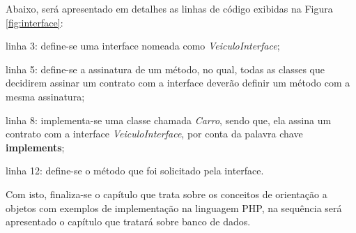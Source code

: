Abaixo, será apresentado em detalhes as linhas de código exibidas na Figura
\ref{fig:interface}:

\begin{alineas}
    \item linha 3: define-se uma interface nomeada como
    \textit{VeiculoInterface};
    \item linha 5: define-se a assinatura de um método, no qual, todas as
    classes que decidirem assinar um contrato com a interface deverão definir um
    método com a mesma assinatura;
    \item linha 8: implementa-se uma classe chamada \textit{Carro}, sendo que,
    ela assina um contrato com a interface \textit{VeiculoInterface}, por conta
    da palavra chave \textbf{implements};
    \item linha 12: define-se o método que foi solicitado pela interface.
\end{alineas}

Com isto, finaliza-se o capítulo que trata sobre os conceitos de orientação a
objetos com exemplos de implementação na linguagem \acs{PHP}, na sequência será
apresentado o capítulo que tratará sobre banco de dados.
